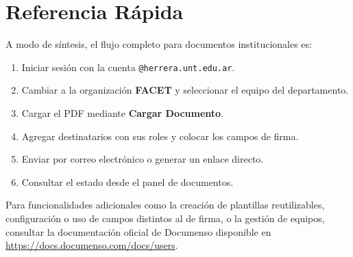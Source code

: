 \documentclass[
    11pt,
    spanish,
]{article}
\begin{document}

\section{Referencia Rápida}
\label{sec:Referencia}

A modo de síntesis, el flujo completo para documentos institucionales es:

\begin{enumerate}[nosep]
    \item Iniciar sesión con la cuenta \texttt{@herrera.unt.edu.ar}.
    \item Cambiar a la organización \textbf{FACET} y seleccionar el equipo del departamento.
    \item Cargar el PDF mediante \textbf{Cargar Documento}.
    \item Agregar destinatarios con sus roles y colocar los campos de firma.
    \item Enviar por correo electrónico o generar un enlace directo.
    \item Consultar el estado desde el panel de documentos.
\end{enumerate}

Para funcionalidades adicionales como la creación de plantillas reutilizables, configuración o uso de campos distintos al de firma, o la gestión de equipos, consultar la documentación oficial de Documenso disponible en \url{https://docs.documenso.com/docs/users}.
\end{document}

